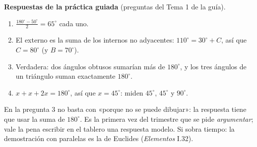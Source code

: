 \documentclass[11pt]{article}
\begin{document}
\begin{center}
\end{center}

\textbf{Respuestas de la práctica guiada} (preguntas del Tema 1 de la guía).
\begin{enumerate}
  \item $\frac{180^\circ - 50^\circ}{2} = 65^\circ$ cada uno.
  \item El externo es la suma de los internos no adyacentes: $110^\circ = 30^\circ + C$,
    así que $C = 80^\circ$ (y $B = 70^\circ$).
  \item Verdadera: dos ángulos obtusos sumarían más de $180^\circ$, y los tres ángulos de un
    triángulo suman exactamente $180^\circ$.
  \item $x + x + 2x = 180^\circ$, así que $x = 45^\circ$: miden $45^\circ$, $45^\circ$ y
    $90^\circ$.
\end{enumerate}

\begin{nota}
En la pregunta 3 no basta con «porque no se puede dibujar»: la respuesta tiene que usar la
suma de $180^\circ$. Es la primera vez del trimestre que se pide \emph{argumentar}; vale la
pena escribir en el tablero una respuesta modelo. Si sobra tiempo: la demostración con
paralelas es la de Euclides (\emph{Elementos} I.32).
\end{nota}
\end{document}
